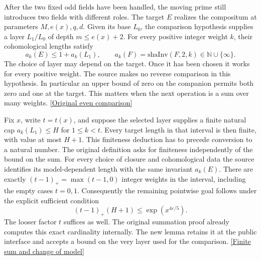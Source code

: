 \documentclass[12pt,letterpaper]{article}
\begin{document}
After the two fixed odd fields have been handled, the moving prime still introduces two fields with different roles. The target \(E\) realizes the compositum at parameters \(M,e(x),q,d\). Given its base \(L_0\), the comparison hypothesis supplies a layer \(L_1/L_0\) of depth \(m\le e(x)+2\). For every positive integer weight \(k\), their cohomological lengths satisfy
\[
  a_k(E)\le 1+a_k(L_1),\qquad
  a_k(F)=\mathrm{shaInv}(F,2,k)\in\mathbb N\cup\{\infty\}.
\]
The choice of layer may depend on the target. Once it has been chosen it works for every positive weight. The source makes no reverse comparison in this hypothesis. In particular an upper bound of zero on the companion permits both zero and one at the target. This matters when the next operation is a sum over many weights.
\href{https://github.com/nousentllc/riemann-hypothesis/blob/40e56bab026552e089d7afcfeff08d2defb9c005/src/Development/AutomorphicArithmetic/AutomorphicVarieties/LayeredIsomorphisms/SecondBound.lean#L36-L44}{[Original even comparison]}

Fix \(x\), write \(t=t(x)\), and suppose the selected layer supplies a finite natural cap \(a_k(L_1)\le H\) for \(1\le k<t\). Every target length in that interval is then finite, with value at most \(H+1\). This finiteness deduction has to precede conversion to a natural number. The original definition asks for finiteness independently of the bound on the sum. For every choice of closure and cohomological data the source identifies its model-dependent length with the same invariant \(a_k(E)\). There are exactly \((t-1)_+=\max(t-1,0)\) integer weights in the interval, including the empty cases \(t=0,1\). Consequently the remaining pointwise goal follows under the explicit sufficient condition
\[
   (t-1)_+(H+1)\le \exp\!\left(x^{4\varepsilon/5}\right).
\]
The looser factor \(t\) suffices as well. The original summation proof already computes this exact cardinality internally. The new lemma retains it at the public interface and accepts a bound on the very layer used for the comparison.
\href{https://github.com/nousentllc/riemann-hypothesis/blob/40e56bab026552e089d7afcfeff08d2defb9c005/src/Development/AutomorphicArithmetic/AutomorphicVarieties/LayeredIsomorphisms/Vvat.lean#L7-L19}{[Finite sum and change of model]}
\end{document}
